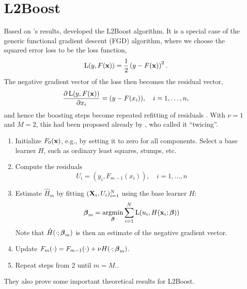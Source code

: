 \section{L2Boost}
Based on \cite{friedman2001}'s results, \cite{buhlmann-yu} developed the L2Boost algorithm. It is a special case of the generic functional gradient descent (FGD) algorithm, where we choose the squared error loss to be the loss function,
\begin{equation*}
    \operatorname{L}(y,F(\mathbf{x}))=\frac{1}{2}\left(y-F(\mathbf{x})\right)^2.
\end{equation*}
The negative gradient vector of the loss then becomes the residual vector,
\begin{equation*}
    \frac{\partial\operatorname{L}(y,F(\mathbf{x}))}{\partial x_i}=(y-F(x_i)),\quad i=1,\dotsc,n,
\end{equation*}
and hence the boosting steps become repeated refitting of residuals \citep{friedman2001,buhlmann-yu}. With $\nu=1$ and $M=2$, this had been proposed already by \citep{tukey}, who called it ``twicing''.
\begin{enumerate}
    \item Initialize $F_0(\mathbf{x})$, e.g., by setting it to zero for all components. Select a base learner $H$, such as ordinary least squares, stumps, etc.
    \item Compute the residuals
        \begin{equation*}
            U_i=(y_i,F_{m-1}(x_i)),\quad i=1,\dotsc,n
        \end{equation*}
    \item Estimate $\hat{H}_m$ by fitting $(\mathbf{X}_i,U_i)_{i=1}^N$ using the base learner $H$:
        \begin{equation*}
            \boldsymbol{\beta}_m=\operatorname*{argmin}_{\boldsymbol{\beta}}\sum_{i=1}^N\operatorname{L}(u_i,H(\mathbf{x}_i;\boldsymbol{\beta}))
        \end{equation*}
        Note that $\hat{H}(\cdot;\boldsymbol{\beta}_m)$ is then an estimate of the negative gradient vector.
    \item Update $F_m(\cdot)=F_{m-1}(\cdot)+\nu H(\cdot;\boldsymbol{\beta}_m)$.
    \item Repeat steps from 2 until $m=M$..
\end{enumerate}
They also prove some important theoretical results for L2Boost.
